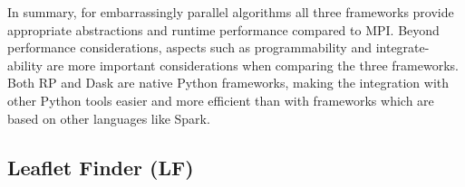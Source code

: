In summary, for embarrassingly parallel algorithms all three frameworks provide
appropriate abstractions and runtime performance compared to MPI. Beyond
performance considerations, aspects such as programmability and
integrate-ability are more important considerations when comparing the three
frameworks. Both RP and Dask are native Python frameworks, making the
integration with other Python tools easier and more efficient than with
frameworks which are based on other languages like Spark.



\subsection{Leaflet Finder (LF)}
\label{sec:leaflet}

